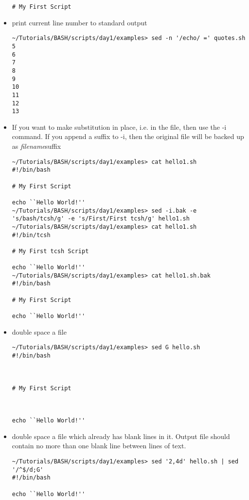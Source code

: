 \documentclass[10pt,t]{beamer}
\begin{document}
\begin{frame}
\begin{itemize}
\begin{lstlisting}[style=LINUX]
# My First Script

      \end{lstlisting}
    \item print current line number to standard output
      \begin{lstlisting}[style=LINUX]
~/Tutorials/BASH/scripts/day1/examples> sed -n '/echo/ =' quotes.sh 
5
6
7
8
9
10
11
12
13
      \end{lstlisting}
    \item If you want to make substitution in place, i.e. in the file, then use the -i command. If you append a suffix to -i, then the original file will be backed up as \textit{filename}suffix
      \begin{lstlisting}[style=LINUX,basicstyle=\fontsize{4}{5}\selectfont\ttfamily]
~/Tutorials/BASH/scripts/day1/examples> cat hello1.sh
#!/bin/bash

# My First Script

echo ``Hello World!''
~/Tutorials/BASH/scripts/day1/examples> sed -i.bak -e 's/bash/tcsh/g' -e 's/First/First tcsh/g' hello1.sh 
~/Tutorials/BASH/scripts/day1/examples> cat hello1.sh
#!/bin/tcsh

# My First tcsh Script

echo ``Hello World!''
~/Tutorials/BASH/scripts/day1/examples> cat hello1.sh.bak
#!/bin/bash

# My First Script

echo ``Hello World!''
      \end{lstlisting}
      \item double space a file
        \begin{lstlisting}[style=LINUX]
~/Tutorials/BASH/scripts/day1/examples> sed G hello.sh 
#!/bin/bash



# My First Script



echo ``Hello World!''

        \end{lstlisting}
        \framebreak
      \item double space a file which already has blank lines in it. Output file should contain no more than one blank line between lines of text.
        \begin{lstlisting}[style=LINUX]
~/Tutorials/BASH/scripts/day1/examples> sed '2,4d' hello.sh | sed '/^$/d;G'
#!/bin/bash

echo ``Hello World!''


\end{lstlisting}
\end{itemize}
\end{frame}
\end{document}
